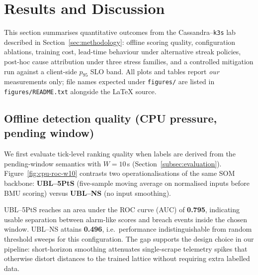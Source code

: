 \documentclass[sigconf]{acmart}
\begin{document}

\section{Results and Discussion}
\label{sec:results}

This section summarises quantitative outcomes from the Cassandra--\texttt{k3s} lab described in Section~\ref{sec:methodology}: offline scoring quality, configuration ablations, training cost, lead-time behaviour under alternative streak policies, post-hoc cause attribution under three stress families, and a controlled mitigation run against a client-side $p_{95}$ SLO band. All plots and tables report \emph{our} measurements only; file names expected under \texttt{figures/} are listed in \texttt{figures/README.txt} alongside the \LaTeX{} source.

\subsection{Offline detection quality (CPU pressure, pending window)}
\label{subsec:res-roc}

We first evaluate tick-level ranking quality when labels are derived from the pending-window semantics with $W{=}10$\,s (Section~\ref{subsec:evaluation}). Figure~\ref{fig:cpu-roc-w10} contrasts two operationalisations of the same SOM backbone: \textbf{UBL--5PtS} (five-sample moving average on normalised inputs before BMU scoring) versus \textbf{UBL--NS} (no input smoothing).

UBL--5PtS reaches an area under the ROC curve (AUC) of \textbf{0.795}, indicating usable separation between alarm-like scores and breach events inside the chosen window. UBL--NS attains \textbf{0.496}, i.e.\ performance indistinguishable from random threshold sweeps for this configuration. The gap supports the design choice in our pipeline: short-horizon smoothing attenuates single-scrape telemetry spikes that otherwise distort distances to the trained lattice without requiring extra labelled data.
\end{document}
